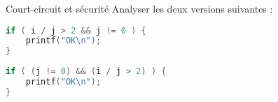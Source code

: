 \begin{UPSTIexercice}{Court-circuit et sécurité}
Analyser les deux versions suivantes :\\
\begin{minipage}{.49\linewidth}
\begin{lstlisting}[language=C]
if ( i / j > 2 && j != 0 ) {
    printf("OK\n");
}
\end{lstlisting}
\end{minipage}
\begin{minipage}{.49\linewidth}
\begin{lstlisting}[language=C]
if ( (j != 0) && (i / j > 2) ) {
    printf("OK\n");
}
\end{lstlisting}
\end{minipage}
\end{UPSTIexercice}


